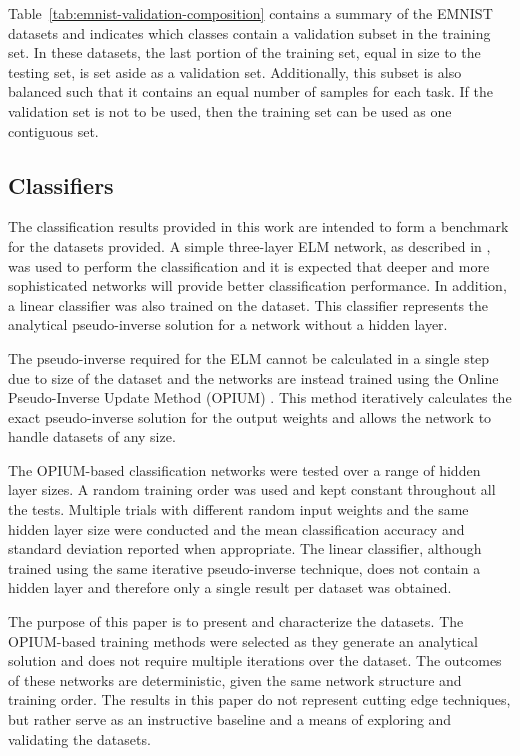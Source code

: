 \documentclass[conference]{IEEEtran}
\begin{document}
Table~\ref{tab:emnist-validation-composition} contains a summary of the EMNIST datasets and indicates which classes contain a validation subset in the training set. In these datasets, the last portion of the training set, equal in size to the testing set, is set aside as a validation set. Additionally, this subset is also balanced such that it contains an equal number of samples for each task. If the validation set is not to be used, then the training set can be used as one contiguous set. 

\subsection{Classifiers}
\label{sec:methodology-classifiers}

The classification results provided in this work are intended to form a benchmark for the datasets provided. A simple three-layer ELM network, as described in \cite{Huang2006}, was used to perform the classification and it is expected that deeper and more sophisticated networks will provide better classification performance. In addition, a linear classifier was also trained on the dataset. This classifier represents the analytical pseudo-inverse solution for a network without a hidden layer.

The pseudo-inverse required for the ELM cannot be calculated in a single step due to size of the dataset and the networks are instead trained using the Online Pseudo-Inverse Update Method (OPIUM) \cite{VanSchaik2015b}. This method iteratively calculates the exact pseudo-inverse solution for the output weights and allows the network to handle datasets of any size. 

The OPIUM-based classification networks were tested over a range of hidden layer sizes. A random training order was used and kept constant throughout all the tests. Multiple trials with different random input weights and the same hidden layer size were conducted and the mean classification accuracy and standard deviation reported when appropriate. The linear classifier, although trained using the same iterative pseudo-inverse technique, does not contain a hidden layer and therefore only a single result per dataset was obtained.

The purpose of this paper is to present and characterize the datasets. The OPIUM-based training methods were selected as they generate an analytical solution and does not require multiple iterations over the dataset. The outcomes of these networks are deterministic, given the same network structure and training order. The results in this paper do not represent cutting edge techniques, but rather serve as an instructive baseline and a means of exploring and validating the datasets.
\end{document}
